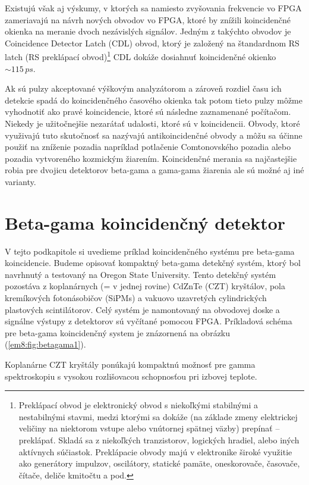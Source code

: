 \documentclass[../../main.tex]{subfiles}
\begin{document}
Existujú však aj výskumy, v ktorých sa namiesto zvyšovania frekvencie vo FPGA zameriavajú na návrh nových obvodov vo FPGA, ktoré by znížili koincidenčné okienka na meranie dvoch nezávislých signálov. Jedným z takýchto obvodov je Coincidence Detector Latch (CDL) obvod, ktorý je založený na štandardnom RS latch (RS preklápací obvod)\footnote{Preklápací obvod je elektronický obvod s niekoľkými stabilnými a nestabilnými stavmi, medzi ktorými sa dokáže (na základe zmeny elektrickej veličiny na niektorom vstupe alebo vnútornej spätnej väzby) prepínať – preklápať. Skladá sa z niekoľkých tranzistorov, logických hradiel, alebo iných aktívnych súčiastok. Preklápacie obvody majú v elektronike široké využitie ako generátory impulzov, oscilátory, statické pamäte, oneskorovače, časovače, čítače, deliče kmitočtu a pod.} CDL dokáže dosiahnuť koincidenčné okienko $\sim 115\,ps$.

Ak sú pulzy akceptované výškovým analyzátorom a zároveň rozdiel času ich detekcie spadá do koincidenčného časového okienka tak potom tieto pulzy môžme vyhodnotiť ako pravé koincidencie, ktoré sú následne zaznamenané počítačom. Niekedy je užitočnejšie nezarátať udalosti, ktoré sú v koincidencii. Obvody, ktoré využivajú tuto skutočnosť sa nazývajú antikoincidenčné obvody a môžu sa účinne použiť na zníženie pozadia napríklad potlačenie Comtonovského pozadia alebo pozadia vytvoreného kozmickým žiarením. Koincidenčné merania sa najčastejšie robia pre dvojicu detektorov beta-gama a gama-gama žiarenia ale sú možné aj iné varianty.

\section{Beta-gama koincidenčný detektor}
V tejto podkapitole si uvedieme príklad koincidenčného systému pre beta-gama koincidencie. Budeme opisovať kompaktný beta-gama  detekčný systém, ktorý bol navrhnutý a testovaný na Oregon State University. Tento detekčný systém pozostáva z koplanárnych (= v jednej rovine) CdZnTe (CZT) kryštálov, pola kremíkových fotonásobičov (SiPMs) a vakuovo uzavretých cylindrických plastových scintilátorov. Celý systém je namontovaný na obvodovej doske a signálne výstupy z detektorov sú vyčítané pomocou FPGA. Príkladová schéma pre beta-gama koincidenčný system je znázornená na obrázku (\ref{em8:fig:betagama1}).

Koplanárne CZT kryštály ponúkajú kompaktnú možnosť pre gamma spektroskopiu s vysokou rozlišovacou schopnosťou pri izbovej teplote.
\end{document}
